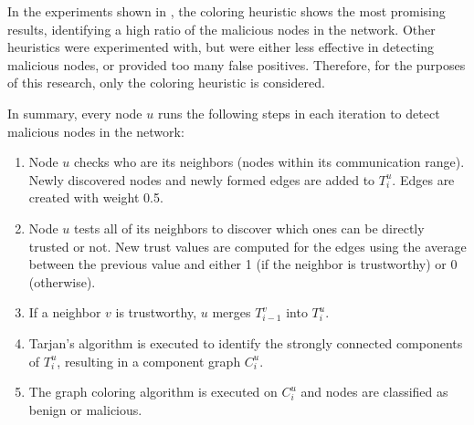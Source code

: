 \documentclass[conference]{IEEEtran}
\begin{document}
In the experiments shown in \cite{vernize2013dissertation}, the coloring heuristic shows the most promising results, identifying a high ratio of the malicious nodes in the network.
Other heuristics were experimented with, but were either less effective in detecting malicious nodes, or provided too many false positives.
Therefore, for the purposes of this research, only the coloring heuristic is considered.

In summary, every node $u$ runs the following steps in each iteration to detect malicious nodes in the network:

\begin{enumerate}
	\item Node $u$ checks who are its neighbors (nodes within its communication range).
		  Newly discovered nodes and newly formed edges are added to $T^u_i$.
		  Edges are created with weight 0.5.
	\item Node $u$ tests all of its neighbors to discover which ones can be directly trusted or not.
		  New trust values are computed for the edges using the average between the previous value and either 1 (if the neighbor is trustworthy) or 0 (otherwise).
	\item If a neighbor $v$ is trustworthy, $u$ merges $T^v_{i-1}$ into $T^u_i$.
	\item Tarjan's algorithm is executed to identify the strongly connected components of $T^u_i$, resulting in a component graph $C^u_i$.
	\item The graph coloring algorithm is executed on $C^u_i$ and nodes are classified as benign or malicious. %
\end{enumerate}

%
\end{document}
